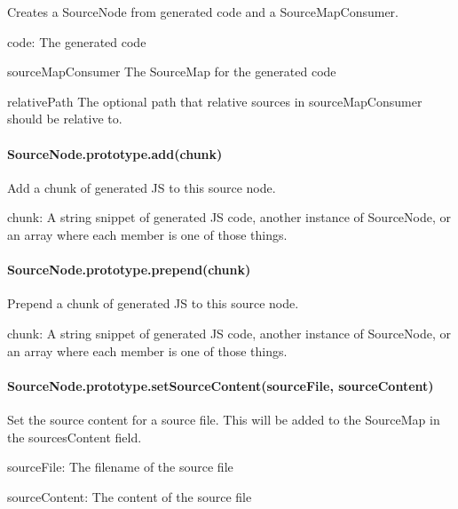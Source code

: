 Creates a Source\+Node from generated code and a Source\+Map\+Consumer.


\begin{DoxyItemize}
\item {\ttfamily code}\+: The generated code
\item {\ttfamily source\+Map\+Consumer} The Source\+Map for the generated code
\item {\ttfamily relative\+Path} The optional path that relative sources in {\ttfamily source\+Map\+Consumer} should be relative to.
\end{DoxyItemize}

\paragraph*{Source\+Node.\+prototype.\+add(chunk)}

Add a chunk of generated J\+S to this source node.


\begin{DoxyItemize}
\item {\ttfamily chunk}\+: A string snippet of generated J\+S code, another instance of {\ttfamily Source\+Node}, or an array where each member is one of those things.
\end{DoxyItemize}

\paragraph*{Source\+Node.\+prototype.\+prepend(chunk)}

Prepend a chunk of generated J\+S to this source node.


\begin{DoxyItemize}
\item {\ttfamily chunk}\+: A string snippet of generated J\+S code, another instance of {\ttfamily Source\+Node}, or an array where each member is one of those things.
\end{DoxyItemize}

\paragraph*{Source\+Node.\+prototype.\+set\+Source\+Content(source\+File, source\+Content)}

Set the source content for a source file. This will be added to the {\ttfamily Source\+Map} in the {\ttfamily sources\+Content} field.


\begin{DoxyItemize}
\item {\ttfamily source\+File}\+: The filename of the source file
\item {\ttfamily source\+Content}\+: The content of the source file
\end{DoxyItemize}

